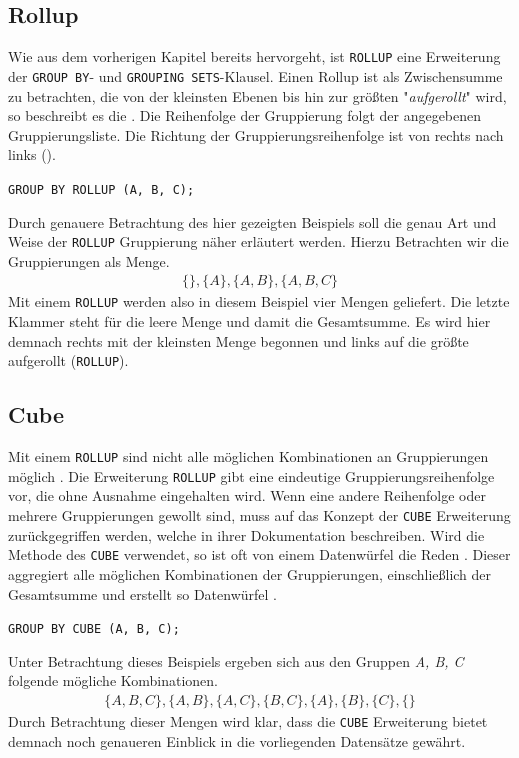 \subsection{Rollup}
\label{subsec:rollup} Wie aus dem vorherigen Kapitel bereits hervorgeht, ist
\texttt{ROLLUP} eine Erweiterung der \texttt{GROUP BY}- und \texttt{GROUPING
SETS}-Klausel. Einen Rollup ist als Zwischensumme zu betrachten, die von der
kleinsten Ebenen bis hin zur größten "\textit{aufgerollt}" wird, so beschreibt
es die \citet{oracle99}. Die Reihenfolge der Gruppierung folgt der angegebenen
Gruppierungsliste. Die Richtung der Gruppierungsreihenfolge ist von rechts nach links
(\cite{oracle16}).

\texttt{GROUP BY ROLLUP (A, B, C);}

Durch genauere Betrachtung des hier gezeigten Beispiels soll die genau Art und Weise
der \texttt{ROLLUP} Gruppierung näher erläutert werden. Hierzu Betrachten wir die
Gruppierungen als Menge.
\begin{align*}
	\{ \}, \{A\}, \{A, B\}, \{A, B, C\}
\end{align*}
Mit einem \texttt{ROLLUP} werden also in diesem Beispiel vier Mengen geliefert.
Die letzte Klammer steht für die leere Menge und damit die Gesamtsumme. Es wird hier
demnach rechts mit der kleinsten Menge begonnen und links auf die größte aufgerollt
(\texttt{ROLLUP}).

\subsection{Cube}
\label{subsec:cube} Mit einem \texttt{ROLLUP} sind nicht alle möglichen Kombinationen
an Gruppierungen möglich \citep{oracle99}. Die Erweiterung \texttt{ROLLUP} gibt
eine eindeutige Gruppierungsreihenfolge vor, die ohne Ausnahme eingehalten wird.
Wenn eine andere Reihenfolge oder mehrere Gruppierungen gewollt sind, muss auf das
Konzept der \texttt{CUBE} Erweiterung zurückgegriffen werden, welche \citet{oracle99}
in ihrer Dokumentation beschreiben. Wird die Methode des \texttt{CUBE} verwendet,
so ist oft von einem Datenwürfel die Reden \citep{oracle99}. Dieser aggregiert alle
möglichen Kombinationen der Gruppierungen, einschließlich der Gesamtsumme und
erstellt so Datenwürfel \citep{oracle99}.

\texttt{GROUP BY CUBE (A, B, C);}

Unter Betrachtung dieses Beispiels ergeben sich aus den Gruppen \textit{A, B, C}
folgende mögliche Kombinationen.
\begin{align*}
	\{ A, B, C\}, \{A, B\}, \{A, C\}, \{B, C\}, \{A\}, \{B\}, \{C\}, \{ \}
\end{align*}
Durch Betrachtung dieser Mengen wird klar, dass die \texttt{CUBE} Erweiterung bietet
demnach noch genaueren Einblick in die vorliegenden Datensätze gewährt.
